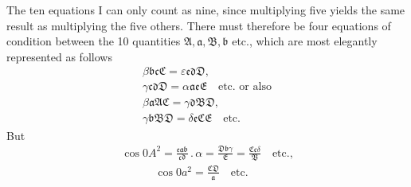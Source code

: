The ten equations I can only count as nine, since multiplying five yields the same result as multiplying the five others.
There must therefore be four equations of condition between the 10 quantities $\mathfrak{A},\mathfrak{a},\mathfrak{B},\mathfrak{b}$ etc., which are most elegantly represented as follows
\[
\begin{gathered} \beta\mathfrak{b}\mathfrak{c}\mathfrak{C}=\varepsilon\mathfrak{e}\mathfrak{d}\mathfrak{D},\\[9pt] \gamma\mathfrak{c}\mathfrak{d}\mathfrak{D}=\alpha\mathfrak{a}\mathfrak{e}\mathfrak{E}\quad\text{etc. or also}\\[9pt] \beta\mathfrak{a}\mathfrak{A}\mathfrak{C}=\gamma\mathfrak{d}\mathfrak{B}\mathfrak{D},\\[9pt] \gamma\mathfrak{b}\mathfrak{B}\mathfrak{D}=\delta\mathfrak{e}\mathfrak{C}\mathfrak{E}\quad\text{etc.} \end{gathered}
\]
But
\[
\begin{gathered}\cos 0A^2=\frac{\mathfrak{e}\mathfrak{a}\mathfrak{b}}{\mathfrak{c}\mathfrak{d}}\mathbin{.}\alpha =\frac{\mathfrak{D}\mathfrak{b}\gamma}{\mathfrak{E}} =\frac{\mathfrak{C}\mathfrak{c}\delta}{\mathfrak{B}}\quad\text{etc.,} \\[9pt]\quad{}\qquad\cos 0a^2=\frac{\mathfrak{C}\mathfrak{D}}{\mathfrak{a}}\quad\text{etc.}\end{gathered}
\]

\clearpage
\endgroup
